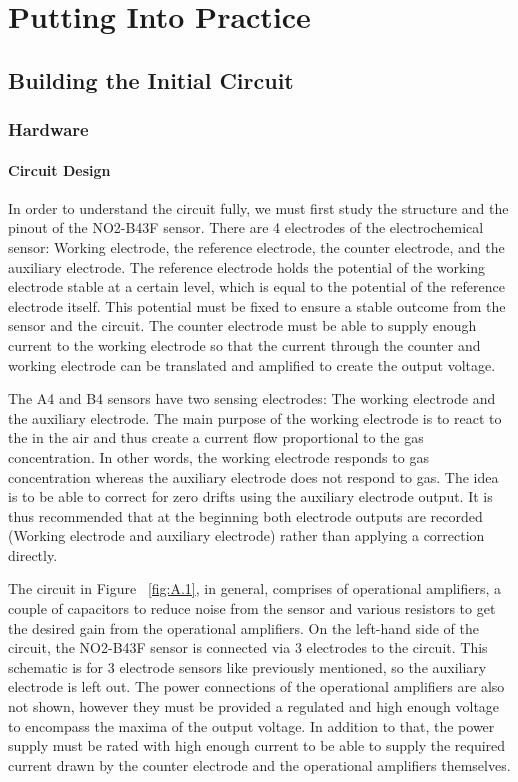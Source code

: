 \chapter{Putting Into Practice}

\section{Building the Initial Circuit}

\subsection{Hardware}
\subsubsection{Circuit Design}
In order to understand the circuit fully, we must first study the structure and the pinout of the NO2-B43F sensor. There are 4 electrodes of the electrochemical sensor: Working electrode, the reference electrode, the counter electrode, and the auxiliary electrode. The reference electrode holds the potential of the working electrode stable at a certain level, which is equal to the potential of the reference electrode itself. This potential must be fixed to ensure a stable outcome from the sensor and the circuit. The counter electrode must be able to supply enough current to the working electrode so that the current through the counter and working electrode can be translated and amplified to create the output voltage.\par
The A4 and B4 sensors have two sensing electrodes: The working electrode and the auxiliary electrode. The main purpose of the working electrode is to react to the  in the air and thus create a current flow proportional to the gas concentration. In other words, the working electrode responds to gas concentration whereas the auxiliary electrode does not respond to gas. The idea is to be able to correct for zero drifts using the auxiliary electrode output. It is thus recommended that at the beginning both electrode outputs are recorded (Working electrode and auxiliary electrode) rather than applying a correction directly.\par
The circuit in Figure ~\ref{fig:A.1}, in general, comprises of operational amplifiers, a couple of capacitors to reduce noise from the sensor and various resistors to get the desired gain from the operational amplifiers. On the left-hand side of the circuit, the NO2-B43F sensor is connected via 3 electrodes to the circuit. This schematic is for 3 electrode sensors like previously mentioned, so the auxiliary electrode is left out. The power connections of the operational amplifiers are also not shown, however they must be provided a regulated and high enough voltage to encompass the maxima of the output voltage. In addition to that, the power supply must be rated with high enough current to be able to supply the required current drawn by the counter electrode and the operational amplifiers themselves.\par
